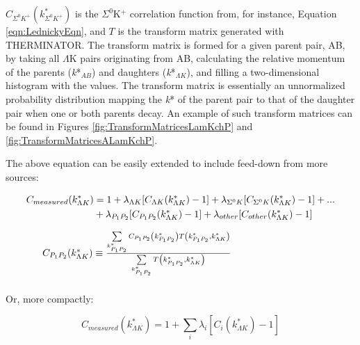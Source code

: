 \documentclass[../AnalysisNoteJBuxton.tex]{subfiles}
\begin{document}
$C_{\Sigma^{0}K^{+}}(k^{*}_{\Sigma^{0}K^{+}})$ is the $\Sigma^{0}$K$^{+}$ correlation function from, for instance, Equation \ref{eqn:LednickyEqn}, and $T$ is the transform matrix generated with THERMINATOR.  The transform matrix is formed for a given parent pair, AB, by taking all $\Lambda$K pairs originating from AB, calculating the relative momentum of the parents (\textit{k}*$_{AB}$) and daughters (\textit{k}*$_{\Lambda K}$), and filling a two-dimensional histogram with the values. The transform matrix is essentially an unnormalized probability distribution mapping the \textit{k}* of the parent pair to that of the daughter pair when one or both parents decay.  An example of such transform matrices can be found in Figures \ref{fig:TransformMatricesLamKchP} and \ref{fig:TransformMatricesALamKchP}.

  The above equation can be easily extended to include feed-down from more sources:

\begin{equation}
\begin{array}{l}
\vspace{4mm}
\begin{split}
 C_{measured}(k^{*}_{\Lambda K}) & = 1 + \lambda_{\Lambda K}[C_{\Lambda K}(k^{*}_{\Lambda K})-1] + \lambda_{\Sigma^{0}K}[C_{\Sigma^{0}K}(k^{*}_{\Lambda K})-1] + ... \\ &
 + \lambda_{P_{1}P_{2}}[C_{P_{1}P_{2}}(k^{*}_{\Lambda K})-1] + \lambda_{other}[C_{other}(k^{*}_{\Lambda K})-1] 
\end{split}
\\
\vspace{2mm}
  ~~~~~C_{P_{1}P_{2}}(k^{*}_{\Lambda K}) \equiv \frac{\sum\limits_{k^{*}_{P_{1}P_{2}}} C_{P_{1}P_{2}}\left(k^{*}_{P_{1}P_{2}}\right) T\left(k^{*}_{P_{1}P_{2}},k^{*}_{\Lambda K}\right)}{\sum\limits_{k^{*}_{P_{1}P_{2}}} T\left(k^{*}_{P_{1}P_{2}},k^{*}_{\Lambda K}\right)}
\end{array} 
\label{eqn:ResidualsFull}
\end{equation}

  Or, more compactly:

\begin{equation}
 C_{measured}(k^{*}_{\Lambda K}) = 1 + \sum\limits_{i}  \lambda_{i}[C_{i}(k^{*}_{\Lambda K})-1]
\label{eqn:Residuals}
\end{equation}
\end{document}
